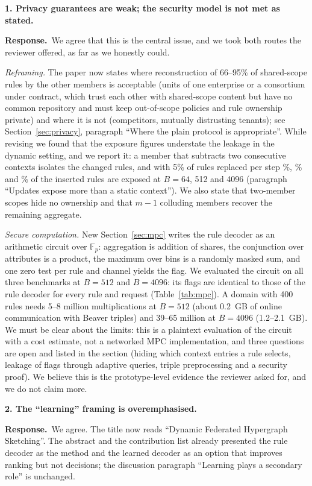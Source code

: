 \documentclass[11pt,a4paper]{article}
\newcommand{\concern}[2]{\medskip\noindent\textbf{#1}\quad\emph{#2}\par\smallskip}
\newcommand{\resp}{\noindent\textcolor{blue!55!black}{\textbf{Response.}}\ }
\begin{document}
\concern{1. Privacy guarantees are weak; the security model is not met as stated.}{}
\resp We agree that this is the central issue, and we took both routes the reviewer offered, as far as we honestly could.

\emph{Reframing.} The paper now states where reconstruction of 66--95\% of shared-scope rules by the other members is acceptable (units of one enterprise or a consortium under contract, which trust each other with shared-scope content but have no common repository and must keep out-of-scope policies and rule ownership private) and where it is not (competitors, mutually distrusting tenants); see Section~\ref{sec:privacy}, paragraph ``Where the plain protocol is appropriate''. While revising we found that the exposure figures understate the leakage in the dynamic setting, and we report it: a member that subtracts two consecutive contexts isolates the changed rules, and with 5\% of rules replaced per step \rvupdlxiv\%, \rvupddxii\% and \rvupdmmmmxcvi\% of the inserted rules are exposed at $B=64$, 512 and 4096 (paragraph ``Updates expose more than a static context''). We also state that two-member scopes hide no ownership and that $m-1$ colluding members recover the remaining aggregate.

\emph{Secure computation.} New Section~\ref{sec:mpc} writes the rule decoder as an arithmetic circuit over $\mathbb{F}_p$: aggregation is addition of shares, the conjunction over attributes is a product, the maximum over bins is a randomly masked sum, and one zero test per rule and channel yields the flag. We evaluated the circuit on all three benchmarks at $B=512$ and $B=4096$: its flags are identical to those of the rule decoder for every rule and request (Table~\ref{tab:mpc}). A domain with 400 rules needs 5--8 million multiplications at $B=512$ (about 0.2~GB of online communication with Beaver triples) and 39--65 million at $B=4096$ (1.2--2.1~GB). We must be clear about the limits: this is a plaintext evaluation of the circuit with a cost estimate, not a networked MPC implementation, and three questions are open and listed in the section (hiding which context entries a rule selects, leakage of flags through adaptive queries, triple preprocessing and a security proof). We believe this is the prototype-level evidence the reviewer asked for, and we do not claim more.

\concern{2. The ``learning'' framing is overemphasised.}{}
\resp We agree. The title now reads ``Dynamic Federated Hypergraph Sketching''. The abstract and the contribution list already presented the rule decoder as the method and the learned decoder as an option that improves ranking but not decisions; the discussion paragraph ``Learning plays a secondary role'' is unchanged.
\end{document}
